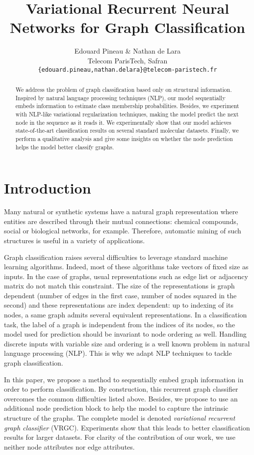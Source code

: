 \documentclass{article} \usepackage{iclr2019_conference}
\title{Variational Recurrent Neural Networks for Graph Classification}
\author{Edouard Pineau \& Nathan de Lara \\
Telecom ParisTech, Safran\\
\texttt{\{edouard.pineau,nathan.delara\}@telecom-paristech.fr} \\
}
\begin{document}
\maketitle

\begin{abstract}
    We address the problem of graph classification based only on structural information. Inspired by natural language processing techniques (NLP), our model sequentially embeds information to estimate class membership probabilities. Besides, we experiment with NLP-like variational regularization techniques, making the model predict the next node in the sequence as it reads it. We experimentally show that our model achieves state-of-the-art classification results on several standard molecular datasets. Finally, we perform a qualitative analysis and give some insights on whether the node prediction helps the model better classify graphs.
    
\end{abstract}

\section{Introduction}

Many natural or synthetic systems have a natural graph representation where entities are described through their mutual connections: chemical compounds, social or biological networks, for example. Therefore, automatic mining of such structures is useful in a variety of applications.

Graph classification raises several difficulties to leverage standard machine learning algorithms. Indeed, most of these algorithms take vectors of fixed size as inputs. In the case of graphs, usual representations such as edge list or adjacency matrix do not match this constraint. The size of the representations is graph dependent (number of edges in the first case, number of nodes squared in the second) and these representations are index dependent: up to indexing of its nodes, a same graph admits several equivalent representations. In a classification task, the label of a graph is independent from the indices of its nodes, so the model used for prediction should be invariant to node ordering as well. Handling discrete inputs with variable size and ordering is a well known problem in natural language processing (NLP). This is why we adapt NLP techniques to tackle graph classification.

In this paper, we propose a method to sequentially embed graph information in order to perform classification. By construction, this recurrent graph classifier overcomes the common difficulties listed above. Besides, we propose to use an additional node prediction block to help the model to capture the intrinsic structure of the graphs. The complete model is denoted \textit{variational recurrent graph classifier} (VRGC). Experiments show that this leads to better classification results for larger datasets. For clarity of the contribution of our work, we use neither node attributes nor edge attributes.
\end{document}
